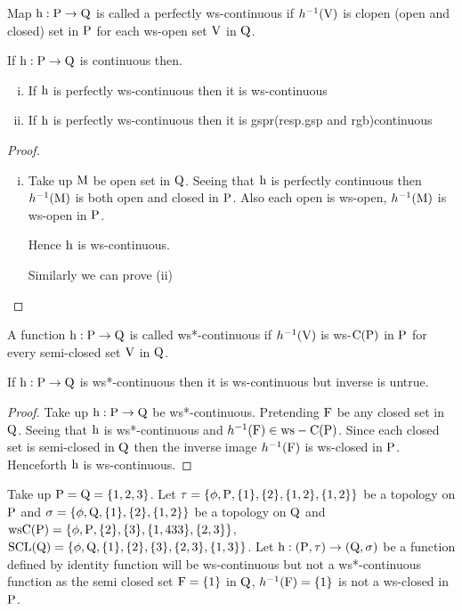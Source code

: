 \begin{dfn}\label{defi3.2.27}
Map $\mathrm{h}: \mathrm{P}\to \mathrm{Q}$ is called a perfectly ws-continuous if $h^{-1} (\mathrm{V})$ is clopen (open and closed) set in $\mathrm{P}$ for each ws-open set $\mathrm{V}$ in $\mathrm{Q}$.
\end{dfn}

\begin{thm}\label{thm3.2.28}
If $\mathrm{h}: \mathrm{P}\to \mathrm{Q}$ is continuous then.
\begin{enumerate}[(i)]
\item If $\mathrm{h}$ is perfectly ws-continuous then it is ws-continuous
\item If $\mathrm{h}$ is perfectly ws-continuous then it is gspr(resp.gsp and rgb)continuous
\end{enumerate}
\end{thm}

\begin{proof}
\begin{enumerate}[(i)]
\item Take up $\mathrm{M}$ be open set in $\mathrm{Q}$. Seeing that $\mathrm{h}$ is perfectly continuous then $h^{-1} (\mathrm{M})$ is both open and closed in $\mathrm{P}$. Also each open is ws-open, $h^{-1} (\mathrm{M})$ is ws-open in $\mathrm{P}$.

Hence $\mathrm{h}$ is ws-continuous.

Similarly we can prove (ii)
\end{enumerate}
\end{proof}

\begin{dfn}\label{defi3.2.29}
A function $\mathrm{h}: \mathrm{P}\to \mathrm{Q}$ is called ws*-continuous if $h^{-1} (\mathrm{V})$ is ws-$\mathrm{C}(\mathrm{P})$ in $\mathrm{P}$ for every semi-closed set $\mathrm{V}$ in $\mathrm{Q}$.
\end{dfn}

\begin{thm}\label{thm3.2.30}
If $\mathrm{h}: \mathrm{P}\to \mathrm{Q}$ is ws*-continuous then it is ws-continuous but inverse is untrue.
\end{thm}

\begin{proof}
Take up $\mathrm{h}: \mathrm{P}\to \mathrm{Q}$ be ws*-continuous. Pretending $\mathrm{F}$ be any closed set in $\mathrm{Q}$. Seeing that $\mathrm{h}$ is ws*-continuous and $h^{-1} (\mathrm{F}) \in \mathrm{ws}-\mathrm{C}(\mathrm{P})$. Since each closed set is semi-closed in $\mathrm{Q}$ then the inverse image $h^{-1}(\mathrm{F})$ is ws-closed in $\mathrm{P}$. Henceforth $\mathrm{h}$ is ws-continuous.
\end{proof}

\begin{exm}\label{exam3.2.31}
Take up $\mathrm{P}=\mathrm{Q}= \{1, 2, 3\}$. Let $\tau = \{\phi, \mathrm{P}, \{1\}, \{2\}, \{1, 2\},\{1,2\}\}$ be a topology on $\mathrm{P}$ and $\sigma =\{\phi, \mathrm{Q}, \{1\}, \{2\},\{1,2\}\}$ be a topology on $\mathrm{Q}$ and $\mathrm{ws}\mathrm{C}(\mathrm{P})= \{\phi, \mathrm{P}, \{2\},\{3\}, \{1, 433\},\{2,3\}\}$, $\mathrm{SCL}(\mathrm{Q})= \{\phi, \mathrm{Q}, \{1\}, \{2\},\{3\}, \{2, 3\},\{1,3\}\}$. Let $\mathrm{h}: (\mathrm{P},\tau )\to (\mathrm{Q}, \sigma)$ be a function defined by identity function will be ws-continuous but not a ws*-continuous function as the semi closed set $\mathrm{F}=\{1\}$ in $\mathrm{Q}$, $h^{-1} (\mathrm{F})=\{1\}$ is not a ws-closed in $\mathrm{P}$.
\end{exm}

